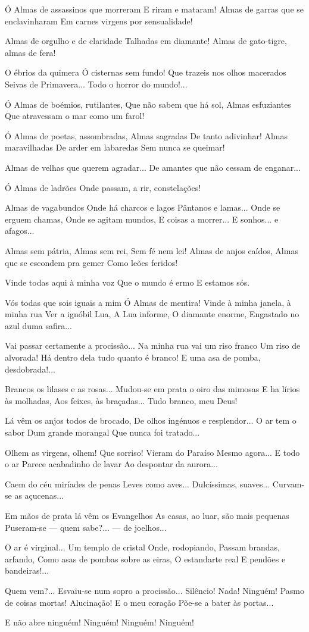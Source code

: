 Ó Almas de assassinos que morreram
E riram e mataram!
Almas de garras que se enclavinharam
Em carnes virgens por sensualidade!

Almas de orgulho e de claridade
Talhadas em diamante!
Almas de gato-tigre, almas de fera!

O ébrios da quimera
Ó cisternas sem fundo!
Que trazeis nos olhos macerados
Seivas de Primavera...
Todo o horror do mundo!...

Ó Almas de boémios, rutilantes,
Que não sabem que há sol,
Almas esfuziantes
Que atravessam o mar como um farol!

Ó Almas de poetas, assombradas,
Almas sagradas
De tanto adivinhar!
Almas maravilhadas
De arder em labaredas
Sem nunca se queimar!

Almas de velhas que querem agradar...
De amantes que não cessam de enganar...

Ó Almas de ladrões
Onde passam, a rir, constelações!

Almas de vagabundos
Onde há charcos e lagos
Pântanos e lamas...
Onde se erguem chamas,
Onde se agitam mundos,
E coisas a morrer...
E sonhos... e afagos...

Almas sem pátria,
Almas sem rei,
Sem fé nem lei!
Almas de anjos caídos,
Almas que se escondem pra gemer
Como leões feridos!

Vinde todas aqui à minha voz
Que o mundo é ermo
E estamos sós.

Vós todas que sois iguais a mim
Ó Almas de mentira!
Vinde à minha janela, à minha rua
Ver a ignóbil Lua,
A Lua informe,
O diamante enorme,
Engastado no azul duma safira...

Vai passar certamente a procissão...
Na minha rua vai um riso franco
Um riso de alvorada!
Há dentro dela tudo quanto é branco!
E uma asa de pomba, desdobrada!...

Brancos os lilases e as rosas...
Mudou-se em prata o oiro das mimosas
E ha lírios às molhadas,
Aos feixes, às braçadas...
Tudo branco, meu Deus!

Lá vêm os anjos todos de brocado,
De olhos ingénuos e resplendor...
O ar tem o sabor
Dum grande morangal
Que nunca foi tratado...

Olhem as virgens, olhem! Que sorriso!
Vieram do Paraíso
Mesmo agora...
E todo o ar
Parece acabadinho de lavar
Ao despontar da aurora...

Caem do céu miríades de penas
Leves como aves...
Dulcíssimas, suaves...
Curvam-se as açucenas...

Em mãos de prata lá vêm os Evangelhos
As casas, ao luar, são mais pequenas
Puseram-se — quem sabe?... — de joelhos...

O ar é virginal...
Um templo de cristal
Onde, rodopiando,
Passam brandas, arfando,
Como asas de pombas sobre as eiras,
O estandarte real
E pendões e bandeiras!...

Quem vem?...
Esvaiu-se num sopro a procissão...
Silêncio! Nada! Ninguém!
Pasmo de coisas mortas!
Alucinação!
E o meu coração
Põe-se a bater às portas...

E não abre ninguém!
Ninguém! Ninguém! Ninguém!